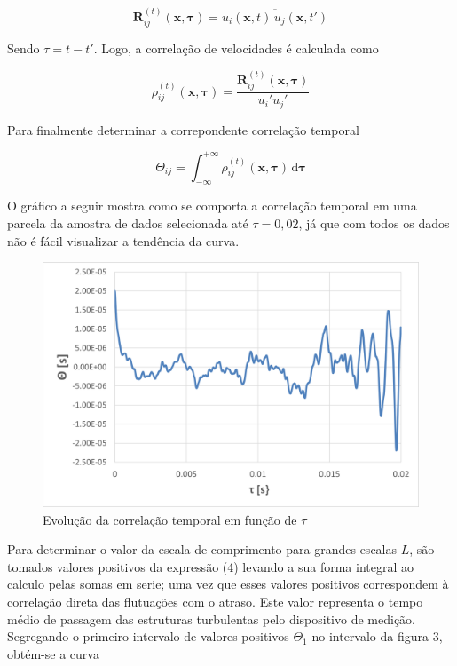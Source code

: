 \documentclass[12pt]{article}
\begin{document}
\begin{equation*}
	\mathbf{R}_{ij}^{(t)}(\mathbf{x}, \boldsymbol{\tau}) = \overline{u_i(\mathbf{x}, t) \, u_j(\mathbf{x}, t')}
\end{equation*}


Sendo $\tau = t - t'$. Logo, a correlação de velocidades é calculada como 

\begin{equation}
	\rho_{ij}^{(t)}(\mathbf{x}, \boldsymbol{\tau}) = 
	\frac{\mathbf{R}_{ij}^{(t)}(\mathbf{x}, \boldsymbol{\tau})}
	{u_i' u_j'}
\end{equation}

Para finalmente determinar a correpondente correlação temporal

\begin{equation}
	\Theta_{ij} = \int_{-\infty}^{+\infty} \rho_{ij}^{(t)}(\mathbf{x}, \boldsymbol{\tau}) \, \mathrm{d} \boldsymbol{\tau}
\end{equation}

O gráfico a seguir mostra como se comporta a correlação temporal em uma parcela da amostra de dados selecionada até $\tau = 0,02$, já que com todos os dados não é fácil visualizar a tendência da curva.

\begin{figure}[H]
	\centering
	\includegraphics[width=.65\textwidth]{figures/3}
	\caption{Evolução da correlação temporal em função de $\tau$}
\end{figure}

Para determinar o valor da escala de comprimento para grandes escalas $L$, são tomados valores positivos da expressão (4) levando a sua forma integral ao calculo pelas somas em serie; uma vez que esses valores positivos correspondem à correlação direta das flutuações com o atraso. Este valor representa o tempo médio de passagem das estruturas turbulentas pelo dispositivo de medição. \\

Segregando o primeiro intervalo de valores positivos $ \Theta_1 $ no intervalo da figura 3, obtém-se a curva
\end{document}
